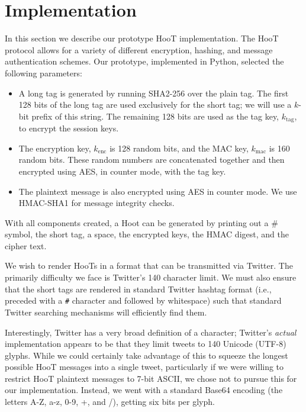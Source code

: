 \section{Implementation}

In this section we describe our prototype HooT implementation.
%
%
The HooT protocol allows for a variety of different encryption, hashing, and message authentication schemes. Our prototype, implemented in Python, selected the following parameters:
\begin{itemize}
\item A long tag is generated by running SHA2-256 over the plain tag. The first 128 bits of the long tag are used exclusively for the short tag; we will use a $k$-bit prefix of this string. The remaining 128 bits are used as the tag key, $k_{\mathrm{tag}}$, to encrypt the session keys.
\item The encryption key, $k_{\mathrm{enc}}$ is 128 random bits, and the MAC key, $k_{\mathrm{mac}}$ is 160 random bits. These random numbers are concatenated together and then encrypted using AES, in counter mode, with the tag key.
\item The plaintext message is also encrypted using AES in counter mode. We use HMAC-SHA1 for message integrity checks.
\end{itemize}

With all components created, a Hoot can be generated by printing out a \# symbol,  the short tag, a space, the encrypted keys, the HMAC digest, and the cipher text.

We wish to render HooTs in a format that can be transmitted via Twitter. The primarily difficulty we face is Twitter's 140 character limit. We must also ensure that the short tags are rendered in standard Twitter hashtag format (i.e., preceded with a {\texttt \#} character and followed by whitespace) such that standard Twitter searching mechanisms will efficiently find them.

Interestingly, Twitter has a very broad definition of a character; Twitter's {\em actual} implementation appears to be that they limit tweets to 140 Unicode (UTF-8) glyphs. While we could certainly take advantage of this to squeeze the longest possible HooT messages into a single tweet, particularly if we were willing to restrict HooT plaintext messages to 7-bit ASCII, we chose not to pursue this for our implementation. Instead, we went with a standard Base64 encoding (the letters A-Z, a-z, 0-9, +, and /), getting six bits per glyph.

